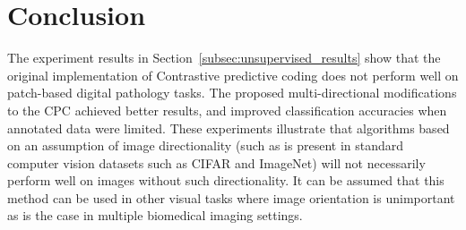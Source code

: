 \section{Conclusion}
\label{sec:conclusion}
The experiment results in Section~\ref{subsec:unsupervised_results} show that the original implementation of Contrastive predictive coding does not perform well on patch-based digital pathology tasks. The proposed multi-directional modifications to the CPC achieved better results, and improved classification accuracies when annotated data were limited. These experiments illustrate that algorithms based on an assumption of image directionality (such as is present in standard computer vision datasets such as CIFAR and ImageNet) will not necessarily perform well on images without such directionality. It can be assumed that this method can be used in other visual tasks where image orientation is unimportant as is the case in multiple biomedical imaging settings.